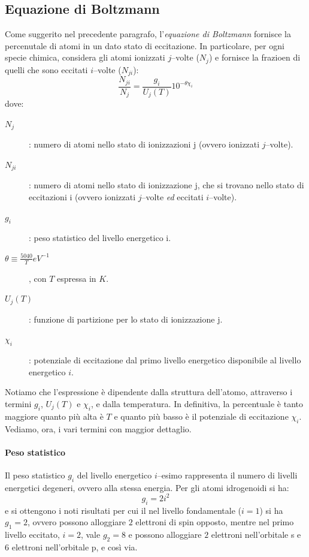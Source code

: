 \subsection{Equazione di Boltzmann}
Come suggerito nel precedente paragrafo, l'\emph{equazione di Boltzmann} fornisce la percenutale di atomi in un dato stato di eccitazione. In particolare, per ogni specie chimica, considera gli atomi ionizzati $j$--volte ($N_j$) e fornisce la frazioen di quelli che sono eccitati $i$--volte ($N_{ji}$):
\begin{equation}\label{eq:equazione-boltzmann}
    \dfrac{N_{ji}}{N_j} = \dfrac{g_i}{{U_j}(T)} 10^{-\theta \chi_i} 
\end{equation}
dove:
\begin{description}
    \item[$N_j$]: numero di atomi nello stato di ionizzazioni j (ovvero ionizzati $j$--volte).
    \item[$N_{ji}$]: numero di atomi nello stato di ionizzazione j, che si trovano nello stato di eccitazioni i (ovvero ionizzati $j$--volte \emph{ed} eccitati $i$--volte).
    \item[$g_i$]: peso statistico del livello energetico i.
    \item[$\theta \equiv \frac{5040}{T} \si{eV^{-1}}$], con $T$ espressa in $\si{K}$.
    \item[${U_j}(T)$]: funzione di partizione per lo stato di ionizzazione j.
    \item[$\chi_i$]: potenziale di eccitazione dal primo livello energetico disponibile al livello energetico $i$.      
\end{description}
Notiamo che l'espressione è dipendente dalla struttura dell'atomo, attraverso i termini $g_i$, ${U_j}(T)$ e $\chi_i$, e dalla temperatura. In definitiva, la percentuale è tanto maggiore quanto più alta è $T$ e quanto più basso è il potenziale di eccitazione $\chi_i$. Vediamo, ora, i vari termini con maggior dettaglio.

\paragraph{Peso statistico}
Il peso statistico $g_i$ del livello energetico $i$--esimo rappresenta il numero di livelli energetici degeneri, ovvero alla stessa energia. Per gli atomi idrogenoidi si ha:
\begin{equation*}
g_i = 2 i^2
\end{equation*}
e si ottengono i noti risultati per cui il nel livello fondamentale ($i=1$) si ha $g_1 = 2$, ovvero possono alloggiare $2$ elettroni di spin opposto, mentre nel primo livello eccitato, $i=2$, vale $g_2=8$ e possono alloggiare $2$ elettroni nell'orbitale s e $6$ elettroni nell'orbitale p, e così via.

